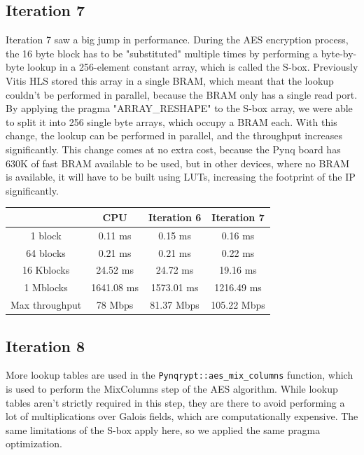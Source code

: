 \documentclass[12pt,oneside,a4paper]{article}
\begin{document}
\subsection{Iteration 7} \label{subsec:iter7}
Iteration 7 saw a big jump in performance. 
During the AES encryption process, the 16 byte block has to be "substituted" multiple times by performing a byte-by-byte lookup in a 256-element constant array, which is called the S-box.
Previously Vitis HLS stored this array in a single BRAM, which meant that the lookup couldn't be performed in parallel, because the BRAM only has a single read port.
By applying the pragma "ARRAY\_RESHAPE" to the S-box array, we were able to split it into 256 single byte arrays, which occupy a BRAM each. With this change, the lookup can be performed in parallel, and the throughput increases significantly.
This change comes at no extra cost, because the Pynq board has 630K of fast BRAM available to be used, but in other devices, where no BRAM is available, it will have to be built using LUTs, increasing the footprint of the IP significantly.

\begin{table}[h!]
	\centering
	\begin{tabular}{cccc}
		\toprule
		 & CPU & Iteration 6 & Iteration 7 \\
		\midrule
		1 block & 0.11 ms & 0.15 ms & 0.16 ms \\
		64 blocks & 0.21 ms & 0.21 ms & 0.22 ms \\
		16 Kblocks & 24.52 ms & 24.72 ms & 19.16 ms \\
		1 Mblocks & 1641.08 ms & 1573.01 ms & 1216.49 ms \\
		Max throughput & 78 Mbps & 81.37 Mbps & 105.22 Mbps \\
		\bottomrule
	\end{tabular}
\end{table}

\subsection{Iteration 8} \label{subsec:iter8}
More lookup tables are used in the {\tt Pynqrypt::aes\_mix\_columns} function, which is used to perform the MixColumns step of the AES algorithm.
While lookup tables aren't strictly required in this step, they are there to avoid performing a lot of multiplications over Galois fields, which are computationally expensive.
The same limitations of the S-box apply here, so we applied the same pragma optimization.
\end{document}
